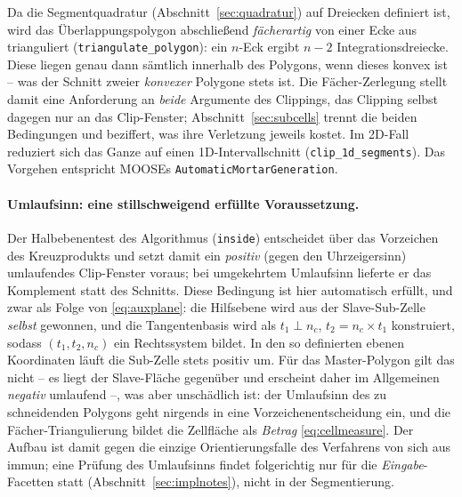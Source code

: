 \documentclass[a4paper,11pt]{article}
\def\bm#1{#1}%
\newcommand{\code}[1]{\texttt{\small #1}}
\begin{document}
Da die Segmentquadratur (Abschnitt~\ref{sec:quadratur}) auf Dreiecken definiert ist, wird das
Überlappungspolygon abschließend \emph{fächerartig} von einer Ecke aus trianguliert
(\code{triangulate\_polygon}): ein $n$-Eck ergibt $n-2$ Integrationsdreiecke. Diese liegen genau
dann sämtlich innerhalb des Polygons, wenn dieses konvex ist -- was der Schnitt zweier
\emph{konvexer} Polygone stets ist. Die Fächer-Zerlegung stellt damit eine Anforderung an
\emph{beide} Argumente des Clippings, das Clipping selbst dagegen nur an das Clip-Fenster;
Abschnitt~\ref{sec:subcells} trennt die beiden Bedingungen und beziffert, was ihre Verletzung
jeweils kostet. Im 2D-Fall reduziert sich das Ganze auf einen 1D-Intervallschnitt
(\code{clip\_1d\_segments}). Das Vorgehen entspricht MOOSEs \code{AutomaticMortarGeneration}.

\paragraph{Umlaufsinn: eine stillschweigend erfüllte Voraussetzung.}
Der Halbebenentest des Algorithmus (\code{inside}) entscheidet über das Vorzeichen des
Kreuzprodukts und setzt damit ein \emph{positiv} (gegen den Uhrzeigersinn) umlaufendes Clip-Fenster
voraus; bei umgekehrtem Umlaufsinn lieferte er das Komplement statt des Schnitts. Diese Bedingung
ist hier automatisch erfüllt, und zwar als Folge von \eqref{eq:auxplane}: die Hilfsebene wird aus
der Slave-Sub-Zelle \emph{selbst} gewonnen, und die Tangentenbasis wird als
$\bm t_1\perp\bm n_c$, $\bm t_2=\bm n_c\times\bm t_1$ konstruiert, sodass $(\bm t_1,\bm t_2,\bm
n_c)$ ein Rechtssystem bildet. In den so definierten ebenen Koordinaten läuft die Sub-Zelle stets
positiv um. Für das Master-Polygon gilt das nicht -- es liegt der Slave-Fläche gegenüber und
erscheint daher im Allgemeinen \emph{negativ} umlaufend --, was aber unschädlich ist: der
Umlaufsinn des zu schneidenden Polygons geht nirgends in eine Vorzeichenentscheidung ein, und die
Fächer-Triangulierung bildet die Zellfläche als \emph{Betrag} \eqref{eq:cellmeasure}. Der
Aufbau ist damit gegen die einzige Orientierungsfalle des Verfahrens von sich aus immun; eine
Prüfung des Umlaufsinns findet folgerichtig nur für die \emph{Eingabe}-Facetten statt
(Abschnitt~\ref{sec:implnotes}), nicht in der Segmentierung.
\end{document}
